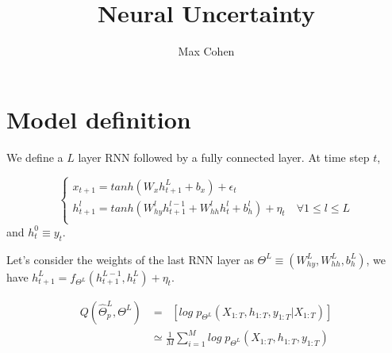 \documentclass[11pt,a4paper]{report}
\begin{document}
\title{Neural Uncertainty}
\author{Max Cohen}
\maketitle

\chapter{Model definition}
We define a $L$ layer RNN followed by a fully connected layer. At time step $t$,

$$
    \left\{
    \begin{array}{ll}
        x_{t+1} = tanh(W_x h_{t+1}^L + b_x) + \epsilon_t                                                             \\
        h_{t+1}^l = tanh(W_{hy}^l h^{l-1}_{t+1} + W_{hh}^l h^{l}_{t} + b_h^l) + \eta_t \quad \forall 1 \leq l \leq L \\
    \end{array}
    \right.
$$
and $h_{t}^0 \equiv y_{t}$.

Let's consider the weights of the last RNN layer as $\Theta^L \equiv (W_{hy}^L, W_{hh}^L, b_h^L)$, we have
$h_{t+1}^L = f_{\Theta^L}(h_{t+1}^{L-1}, h_{t}^L) + \eta_t$.

\begin{align}
    Q(\hat \Theta^L_p, \Theta^L) & = \mathop{\mathbb{E}_{\hat \Theta^L_p}} \left[ log \; p_{\Theta^L}(X_{1:T}, h_{1:T}, y_{1:T} | X_{1:T}) \right] \\
                                 & \simeq \frac{1}{M} \sum_{i=1}^M  log \; p_{\Theta^L}(X_{1:T}, h_{1:T}, y_{1:T})
\end{align}
\end{document}
